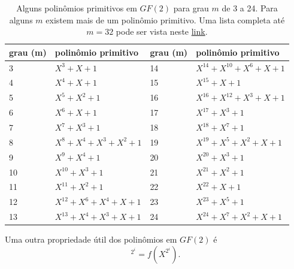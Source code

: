 \begin{frame}[allowframebreaks]
  \framebreak
  \begin{table}[h!]
    \centering
    \caption{Alguns polinômios primitivos em $GF(2)$ para grau $m$ de 3 a 24. Para alguns $m$ existem mais de um polinômio primitivo. Uma lista completa até $m=32$ pode ser vista neste \href{https://www.partow.net/programming/polynomials/primitive_polynomials_GF2.txt}{link}.}
    \begin{tabular}{llll}
        \hline
        grau (m) & polinômio primitivo & grau (m) & polinômio primitivo \\
        \hline
        \rule{0pt}{2.6ex}%
        3 & $X^3 + X + 1$ & 14 & $X^{14} + X^{10} + X^6 + X + 1$ \\
        4 & $X^4 + X + 1$ & 15 & $X^{15} + X + 1$ \\
        5 & $X^5 + X^2 + 1$ & 16 & $X^{16} + X^{12} + X^3 + X + 1$ \\
        6 & $X^6 + X + 1$ & 17 & $X^{17} + X^3 + 1$ \\
        7 & $X^7 + X^3 + 1$ & 18 & $X^{18} + X^7 + 1$ \\
        8 & $X^8 + X^4 + X^3 + X^2 + 1$ & 19 & $X^{19} + X^5 + X^2 + X + 1$ \\
        9 & $X^9 + X^4 + 1$ & 20 & $X^{20} + X^3 + 1$ \\
        10 & $X^{10} + X^3 + 1$ & 21 & $X^{21} + X^2 + 1$ \\
        11 & $X^{11} + X^2 + 1$ & 22 & $X^{22} + X + 1$ \\
        12 & $X^{12} + X^6 + X^4 + X + 1$ & 23 & $X^{23} + X^5 + 1$ \\
        13 & $X^{13} + X^4 + X^3 + X + 1$ & 24 & $X^{24} + X^7 + X^2 + X + 1$ \\
        \hline
    \end{tabular}
  \end{table}

  \framebreak
  Uma outra propriedade útil dos polinômios em $GF(2)$ é
  \begin{equation}
    [f(X)]^{2^i} = f(X^{2^i}).
  \end{equation}


\end{frame}

